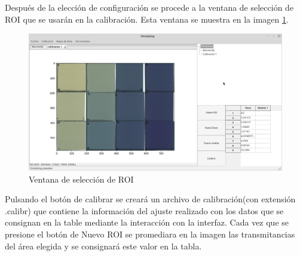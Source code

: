 Después de la elección de configuración se procede a la ventana de selección de ROI que se usarán en la calibración. Esta ventana se muestra en la imagen \ref{fig:menuEleccionDosis}.
\begin{figure}[H]
	\centering
	\includegraphics[width=0.7\linewidth]{images/imagenesDocumentacion/menuEleccionDosis.png}
	\caption{Ventana de selección de ROI }
	\label{fig:menuEleccionDosis}
\end{figure}
Pulsando el botón de calibrar se creará un archivo de calibración(con extensión .calibr) que contiene la información del ajuste realizado con los datos que se consignan en la table mediante la interacción con la interfaz. Cada vez que se presione el botón de Nuevo ROI se promediara en la imagen las transmitancias del área elegida y se consignará este valor en la tabla.